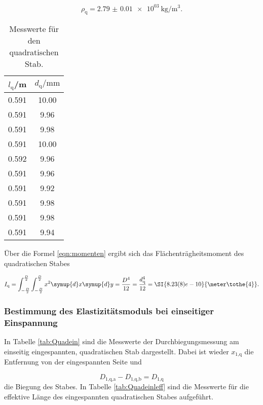 \begin{equation}
  \rho_\text{q} = \SI{2.79(1)e03}{\kilo\gram\per\cubic\meter}.
\end{equation}

\begin{table}[H]
  \centering
  \caption{Messwerte für den quadratischen Stab.}
  \label{tab:Dichtequad}
  \begin{tabular}{c c}
    \toprule
    $l_\text{q}$/\si{\meter} & $d_\text{q}/\si{\milli\meter}$ \\
    \midrule
    0.591 & 10.00 \\
    0.591 & 9.96 \\
    0.591 & 9.98 \\
    0.591 & 10.00 \\
    0.592 & 9.96 \\
    0.591 & 9.96 \\
    0.591 & 9.92 \\
    0.591 & 9.98 \\
    0.591 & 9.98 \\
    0.591 & 9.94 \\
    \bottomrule
  \end{tabular}
\end{table}

Über die Formel \eqref{eqn:momenten} ergibt sich das Flächenträgheitsmoment des
quadratischen Stabes

\begin{equation}
  I_\text{q} = \int_{-\frac{D}{2}}^{\frac{D}{2}}
  \int_{-\frac{D}{2}}^{\frac{D}{2}} x^2 \symup{d}x \symup{d}y = \frac{D^4}{12} =
  \frac{d_\text{q}^4}{12} = \SI{8.23(8)e-10}{\meter\tothe{4}}.
\end{equation}

\subsubsection{Bestimmung des Elastizitätsmoduls bei einseitiger Einspannung}

In Tabelle \ref{tab:Quadein} sind die Messwerte der Durchbiegungsmessung am
einseitig eingespannten, quadratischen Stab dargestellt.
Dabei ist wieder $x_\text{1,q}$ die Entfernung von der eingespannten Seite
und

\begin{equation}
  D_\text{1,q,a} - D_\text{1,q,b} = D_\text{1,q}
\end{equation}
die Biegung des Stabes.
In Tabelle \ref{tab:Quadeinleff} sind die Messwerte für die effektive
Länge des eingespannten quadratischen Stabes aufgeführt.

